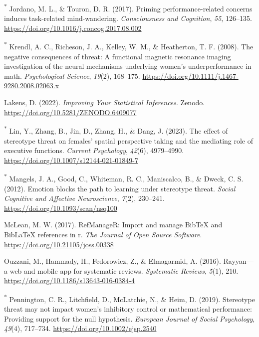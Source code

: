 \documentclass[
  stu,floatsintext]{apa7}
\newlength{\cslhangindent}
\newenvironment{CSLReferences}[2] %
 {\begin{list}{}{%
  \setlength{\itemindent}{0pt}
  \setlength{\leftmargin}{0pt}
  \setlength{\parsep}{0pt}
  \ifodd #1
   \setlength{\leftmargin}{\cslhangindent}
   \setlength{\itemindent}{-1\cslhangindent}
  \fi
  \setlength{\itemsep}{#2\baselineskip}}}
 {\end{list}}
\begin{document}
\begin{CSLReferences}{1}{0}
\textsuperscript{*} Jordano, M. L., \& Touron, D. R. (2017). Priming performance-related concerns induces task-related mind-wandering. \emph{Consciousness and Cognition}, \emph{55}, 126--135. \url{https://doi.org/10.1016/j.concog.2017.08.002}

\textsuperscript{*} Krendl, A. C., Richeson, J. A., Kelley, W. M., \& Heatherton, T. F. (2008). The negative consequences of threat: A functional magnetic resonance imaging investigation of the neural mechanisms underlying women's underperformance in math. \emph{Psychological Science}, \emph{19}(2), 168--175. \url{https://doi.org/10.1111/j.1467-9280.2008.02063.x}

Lakens, D. (2022). \emph{Improving {Your Statistical Inferences}}. Zenodo. \url{https://doi.org/10.5281/ZENODO.6409077}

\textsuperscript{*} Lin, Y., Zhang, B., Jin, D., Zhang, H., \& Dang, J. (2023). The effect of stereotype threat on females' spatial perspective taking and the mediating role of executive functions. \emph{Current Psychology}, \emph{42}(6), 4979--4990. \url{https://doi.org/10.1007/s12144-021-01849-7}

\textsuperscript{*} Mangels, J. A., Good, C., Whiteman, R. C., Maniscalco, B., \& Dweck, C. S. (2012). Emotion blocks the path to learning under stereotype threat. \emph{Social Cognitive and Affective Neuroscience}, \emph{7}(2), 230--241. \url{https://doi.org/10.1093/scan/nsq100}

McLean, M. W. (2017). RefManageR: Import and manage BibTeX and BibLaTeX references in r. \emph{The Journal of Open Source Software}. \url{https://doi.org/10.21105/joss.00338}

Ouzzani, M., Hammady, H., Fedorowicz, Z., \& Elmagarmid, A. (2016). Rayyan---a web and mobile app for systematic reviews. \emph{Systematic Reviews}, \emph{5}(1), 210. \url{https://doi.org/10.1186/s13643-016-0384-4}

\textsuperscript{*} Pennington, C. R., Litchfield, D., McLatchie, N., \& Heim, D. (2019). Stereotype threat may not impact women's inhibitory control or mathematical performance: {Providing} support for the null hypothesis. \emph{European Journal of Social Psychology}, \emph{49}(4), 717--734. \url{https://doi.org/10.1002/ejsp.2540}


\end{CSLReferences}
\end{document}

